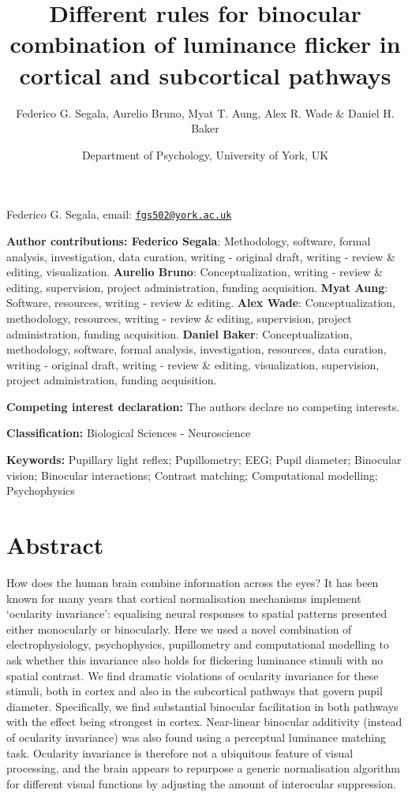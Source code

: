 \documentclass[
]{article}
\title{Different rules for binocular combination of luminance flicker in cortical and subcortical pathways}
\author{Federico G. Segala, Aurelio Bruno, Myat T. Aung, Alex R. Wade \& Daniel H. Baker}
\date{Department of Psychology, University of York, UK}
\begin{document}
\maketitle

Federico G. Segala, email: \href{mailto:fgs502@york.ac.uk}{\nolinkurl{fgs502@york.ac.uk}}

\textbf{Author contributions: Federico Segala}: Methodology, software, formal analysis, investigation, data curation, writing - original draft, writing - review \& editing, visualization. \textbf{Aurelio Bruno}: Conceptualization, writing - review \& editing, supervision, project administration, funding acquisition. \textbf{Myat Aung}: Software, resources, writing - review \& editing. \textbf{Alex Wade}: Conceptualization, methodology, resources, writing - review \& editing, supervision, project administration, funding acquisition. \textbf{Daniel Baker}: Conceptualization, methodology, software, formal analysis, investigation, resources, data curation, writing - original draft, writing - review \& editing, visualization, supervision, project administration, funding acquisition.

\textbf{Competing interest declaration:} The authors declare no competing interests.

\textbf{Classification:} Biological Sciences - Neuroscience

\textbf{Keywords:} Pupillary light reflex; Pupillometry; EEG; Pupil diameter; Binocular vision; Binocular interactions; Contrast matching; Computational modelling; Psychophysics

\hypertarget{abstract}{%
\section{Abstract}\label{abstract}}

How does the human brain combine information across the eyes? It has been known for many years that cortical normalisation mechanisms implement `ocularity invariance': equalising neural responses to spatial patterns presented either monocularly or binocularly. Here we used a novel combination of electrophysiology, psychophysics, pupillometry and computational modelling to ask whether this invariance also holds for flickering luminance stimuli with no spatial contrast. We find dramatic violations of ocularity invariance for these stimuli, both in cortex and also in the subcortical pathways that govern pupil diameter. Specifically, we find substantial binocular facilitation in both pathways with the effect being strongest in cortex. Near-linear binocular additivity (instead of ocularity invariance) was also found using a perceptual luminance matching task. Ocularity invariance is therefore not a ubiquitous feature of visual processing, and the brain appears to repurpose a generic normalisation algorithm for different visual functions by adjusting the amount of interocular suppression.
\end{document}
